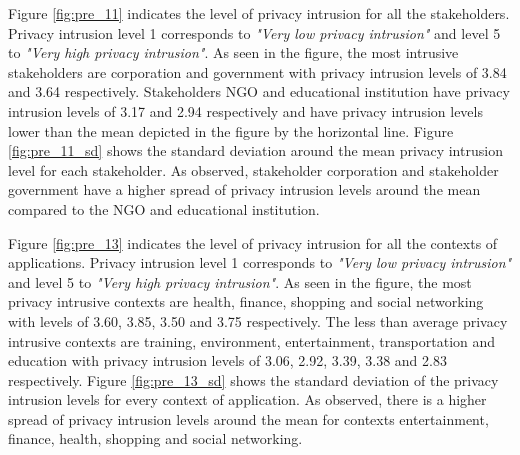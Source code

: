 Figure \ref{fig:pre_11} indicates the level of privacy intrusion for all the stakeholders. Privacy intrusion level 1 corresponds to \textit{"Very low privacy intrusion"} and level 5 to \textit{"Very high privacy intrusion"}. As seen in the figure, the most intrusive stakeholders are corporation and government with privacy intrusion levels of 3.84 and 3.64 respectively. Stakeholders NGO and educational institution have privacy intrusion levels of 3.17 and 2.94 respectively and have privacy intrusion levels lower than the mean depicted in the figure by the horizontal line. Figure \ref{fig:pre_11_sd} shows the standard deviation around the mean privacy intrusion level for each stakeholder. As observed, stakeholder corporation and stakeholder government have a higher spread of privacy intrusion levels around the mean compared to the NGO and educational institution.

Figure \ref{fig:pre_13} indicates the level of privacy intrusion for all the contexts of applications.  Privacy intrusion level 1 corresponds to \textit{"Very low privacy intrusion"} and level 5 to \textit{"Very high privacy intrusion"}. As seen in the figure, the most privacy intrusive contexts are health, finance, shopping and social networking with levels of 3.60, 3.85, 3.50 and 3.75 respectively. The less than average privacy intrusive contexts are training, environment, entertainment, transportation and education with privacy intrusion levels of 3.06, 2.92, 3.39, 3.38 and 2.83 respectively. Figure \ref{fig:pre_13_sd} shows the standard deviation of the privacy intrusion levels for every context of application. As observed, there is a higher spread of privacy intrusion levels around the mean for contexts entertainment, finance, health, shopping and social networking.



%

%



